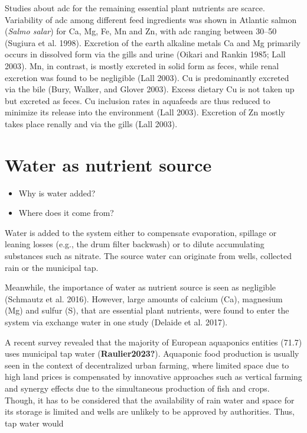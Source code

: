\documentclass[preprint, 3p,
authoryear]{elsarticle} %
\providecommand{\tightlist}{%
  \setlength{\itemsep}{0pt}\setlength{\parskip}{0pt}}
\begin{document}
Studies about \gls{adc} for the remaining essential plant nutrients are
scarce. Variability of \gls{adc} among different feed ingredients was
shown in Atlantic salmon (\emph{Salmo salar}) for Ca, Mg, Fe, Mn and Zn,
with \gls{adc} ranging between \SIrange{30}{50}{\p} (Sugiura et al.
1998). Excretion of the earth alkaline metals Ca and Mg primarily occurs
in dissolved form via the gills and urine (Oikari and Rankin 1985; Lall
2003). Mn, in contrast, is mostly excreted in solid form as feces, while
renal excretion was found to be negligible (Lall 2003). Cu is
predominantly excreted via the bile (Bury, Walker, and Glover 2003).
Excess dietary Cu is not taken up but excreted as feces. Cu inclusion
rates in aquafeeds are thus reduced to minimize its release into the
environment (Lall 2003). Excretion of Zn mostly takes place renally and
via the gills (Lall 2003).

\hypertarget{water-as-nutrient-source}{%
\section{Water as nutrient source}\label{water-as-nutrient-source}}

\begin{itemize}
\tightlist
\item
  Why is water added?
\item
  Where does it come from?
\end{itemize}

Water is added to the system either to compensate evaporation, spillage
or leaning losses (e.g., the drum filter backwash) or to dilute
accumulating substances such as nitrate. The source water can originate
from wells, collected rain or the municipal tap.

Meanwhile, the importance of water as nutrient source is seen as
negligible (Schmautz et al. 2016). However, large amounts of calcium
(Ca), magnesium (Mg) and sulfur (S), that are essential plant nutrients,
were found to enter the system via exchange water in one study (Delaide
et al. 2017).

A recent survey revealed that the majority of European aquaponics
entities (\SI{71.7}{\p}) uses municipal tap water
(\textbf{Raulier2023?}). Aquaponic food production is usually seen in
the context of decentralized urban farming, where limited space due to
high land prices is compensated by innovative approaches such as
vertical farming and synergy effects due to the simultaneous production
of fish and crops. Though, it has to be considered that the availability
of rain water and space for its storage is limited and wells are
unlikely to be approved by authorities. Thus, tap water would
\end{document}
